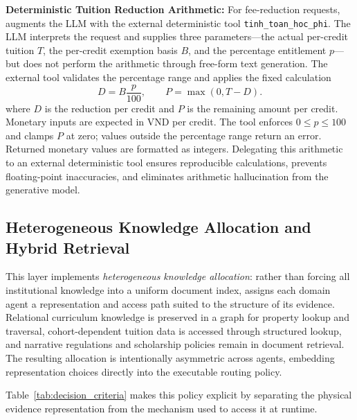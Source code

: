\textbf{Deterministic Tuition Reduction Arithmetic:}
For fee-reduction requests, \system{} augments the LLM with the external deterministic tool \texttt{tinh\_toan\_hoc\_phi}. The LLM interprets the request and supplies three parameters---the actual per-credit tuition $T$, the per-credit exemption basis $B$, and the percentage entitlement $p$---but does not perform the arithmetic through free-form text generation. The external tool validates the percentage range and applies the fixed calculation
\begin{equation}
  D = B\frac{p}{100}, \qquad P = \max(0, T-D).
  \label{eq:tuition_reduction}
\end{equation}
where $D$ is the reduction per credit and $P$ is the remaining amount per credit. Monetary inputs are expected in VND per credit. The tool enforces $0 \le p \le 100$ and clamps $P$ at zero; values outside the percentage range return an error. Returned monetary values are formatted as integers. Delegating this arithmetic to an external deterministic tool ensures reproducible calculations, prevents floating-point inaccuracies, and eliminates arithmetic hallucination from the generative model.

\subsection{Heterogeneous Knowledge Allocation and Hybrid Retrieval}
\label{sec:hybrid_retrieval}

This layer implements \emph{heterogeneous knowledge allocation}: rather than forcing all institutional knowledge into a uniform document index, \system{} assigns each domain agent a representation and access path suited to the structure of its evidence. Relational curriculum knowledge is preserved in a graph for property lookup and traversal, cohort-dependent tuition data is accessed through structured lookup, and narrative regulations and scholarship policies remain in document retrieval. The resulting allocation is intentionally asymmetric across agents, embedding representation choices directly into the executable routing policy.

Table~\ref{tab:decision_criteria} makes this policy explicit by separating the physical evidence representation from the mechanism used to access it at runtime.

